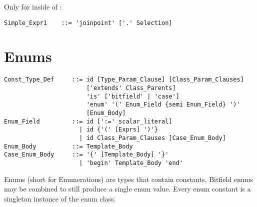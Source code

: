 Only for  inside of :
\begin{lstlisting}
Simple_Expr1    ::= 'joinpoint' ['.' Selection]
\end{lstlisting}






\section{Enums}
\label{sec:enums}

\syntax\begin{lstlisting}
Const_Type_Def     ::= id [Type_Param_Clause] [Class_Param_Clauses]
                       ['extends' Class_Parents] 
                       'is' ['bitfield' | 'case'] 
                       'enum' '(' Enum_Field {semi Enum_Field} ')'
                       [Enum_Body]
Enum_Field         ::= id [':=' scalar_literal]
                     | id {'(' [Exprs] ')'}
                     | id Class_Param_Clauses [Case_Enum_Body]
Enum_Body          ::= Template_Body
Case_Enum_Body     ::= '{' [Template_Body] '}'
                     | 'begin' Template_Body 'end'
\end{lstlisting}

Enums (short for Enumerations) are types that contain constants. Bitfield enums may be combined to still produce a single enum value. Every enum constant is a singleton instance of the enum class. 

